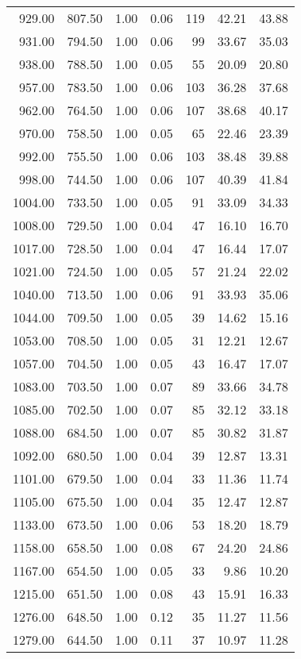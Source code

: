 \begin{table}
\begin{tabular}{rrrrrrr}
929.00 & 807.50 & 1.00 & 0.06 & 119 & 42.21 & 43.88 \\
931.00 & 794.50 & 1.00 & 0.06 & 99 & 33.67 & 35.03 \\
938.00 & 788.50 & 1.00 & 0.05 & 55 & 20.09 & 20.80 \\
957.00 & 783.50 & 1.00 & 0.06 & 103 & 36.28 & 37.68 \\
962.00 & 764.50 & 1.00 & 0.06 & 107 & 38.68 & 40.17 \\
970.00 & 758.50 & 1.00 & 0.05 & 65 & 22.46 & 23.39 \\
992.00 & 755.50 & 1.00 & 0.06 & 103 & 38.48 & 39.88 \\
998.00 & 744.50 & 1.00 & 0.06 & 107 & 40.39 & 41.84 \\
1004.00 & 733.50 & 1.00 & 0.05 & 91 & 33.09 & 34.33 \\
1008.00 & 729.50 & 1.00 & 0.04 & 47 & 16.10 & 16.70 \\
1017.00 & 728.50 & 1.00 & 0.04 & 47 & 16.44 & 17.07 \\
1021.00 & 724.50 & 1.00 & 0.05 & 57 & 21.24 & 22.02 \\
1040.00 & 713.50 & 1.00 & 0.06 & 91 & 33.93 & 35.06 \\
1044.00 & 709.50 & 1.00 & 0.05 & 39 & 14.62 & 15.16 \\
1053.00 & 708.50 & 1.00 & 0.05 & 31 & 12.21 & 12.67 \\
1057.00 & 704.50 & 1.00 & 0.05 & 43 & 16.47 & 17.07 \\
1083.00 & 703.50 & 1.00 & 0.07 & 89 & 33.66 & 34.78 \\
1085.00 & 702.50 & 1.00 & 0.07 & 85 & 32.12 & 33.18 \\
1088.00 & 684.50 & 1.00 & 0.07 & 85 & 30.82 & 31.87 \\
1092.00 & 680.50 & 1.00 & 0.04 & 39 & 12.87 & 13.31 \\
1101.00 & 679.50 & 1.00 & 0.04 & 33 & 11.36 & 11.74 \\
1105.00 & 675.50 & 1.00 & 0.04 & 35 & 12.47 & 12.87 \\
1133.00 & 673.50 & 1.00 & 0.06 & 53 & 18.20 & 18.79 \\
1158.00 & 658.50 & 1.00 & 0.08 & 67 & 24.20 & 24.86 \\
1167.00 & 654.50 & 1.00 & 0.05 & 33 & 9.86 & 10.20 \\
1215.00 & 651.50 & 1.00 & 0.08 & 43 & 15.91 & 16.33 \\
1276.00 & 648.50 & 1.00 & 0.12 & 35 & 11.27 & 11.56 \\
1279.00 & 644.50 & 1.00 & 0.11 & 37 & 10.97 & 11.28 \\
\bottomrule
\end{tabular}
\end{table}
